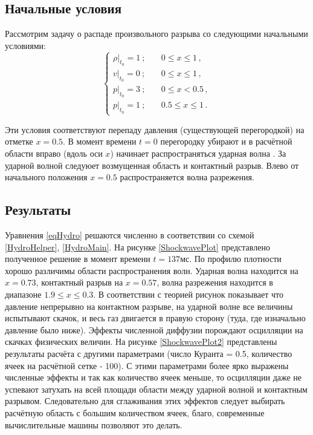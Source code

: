 \documentclass[a4paper]{article}
\begin{document}
	\subsection{Начальные условия}
	Рассмотрим задачу о распаде произвольного разрыва со следующими начальными условиями:
	\begin{equation}
	\begin{cases}
		\left.\rho \right|_{t_0} = 1 \:;		&\quad		0 \leqslant x \leqslant 1 \, ,	\\
		\left. v   \right|_{t_0} = 0 \:;		&\quad		0 \leqslant x \leqslant 1 \, ,	\\
		\left. p   \right|_{t_0} = 3 \:;		&\quad		0 \leqslant x < 0.5 \, ,	\\
		\left. p   \right|_{t_0} = 1 \:;		&\quad		0.5 \leqslant x \leqslant 1 \, .	
	\end{cases}
	\end{equation}	
	
	Эти условия соответствуют перепаду давления (существующей перегородкой) на отметке $x = 0.5$. В момент времени $t = 0$ перегородку убирают и в расчётной области вправо (вдоль оси $x$) начинает распространяться ударная волна \cite{Zeldobich}. За ударной волной следуюет возмущенная область и контактный разрыв. Влево от начального положения $x = 0.5$ распространяется волна разрежения.
	
	\subsection{Результаты}
	Уравнения \eqref{eqHydro} решаются численно в соответствии со схемой \eqref{HydroHelper}, \eqref{HydroMain}. На рисунке \ref{ShockwavePlot} представлено полученное решение в момент времени $t = 137$мс. По профилю плотности хорошо различимы области распространения волн. Ударная волна находится на $x = 0.73$, контактный разрыв на $x = 0.57$, волна разрежения находится в диапазоне $ 1.9 \leqslant x \leqslant 0.3 $. В соответствии с теорией \cite{Rozhd} рисунок показывает что давление непрерывно на контактном разрыве, на ударной волне все величины испытывают скачок, и весь газ двигается в правую сторону (туда, где изначально давление было ниже). Эффекты численной диффузии порождают осцилляции на скачках физических величин. На рисунке \ref{ShockwavePlot2} представлены результаты расчёта с другими параметрами (число Куранта = 0.5, количество ячеек на расчётной сетке - 100). С этими параметрами более ярко выражены численные эффекты и так как количество ячеек меньше, то осцилляции даже не успевают затухать на всей площади области между ударной волной и контактным разрывом. Следовательно для сглаживания этих эффектов следует выбирать расчётную область с большим количеством ячеек, благо, современные вычислительные машины позволяют это делать.
	
\end{document}
